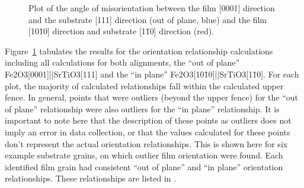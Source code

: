 \documentclass[12pt,%
              twoside,
               letterpaper]{uiothesis}
\begin{document}
\begin{figure}

	\begin{center}
		\caption[Plot of film-substrate misorientations]{%
			Plot of the angle of misorientation between the film
			[0001] direction and the substrate [111] direction (out of plane, 
			blue) and the film [10\={1}0] direction and substrate [1\={1}0] 
			direction (red).}
	\label{fig:orplots}
\end{center}
\end{figure}
Figure~\ref{fig:orplots} tabulates the results for the orientation relationship calculations
including all calculations for both alignments, the ``out of plane''
Fe2O3[0001]||SrTiO3[111] and the ``in plane''
Fe2O3[10\={1}0]||SrTiO3[1\={1}0]. For each plot, the majority of calculated
relationships fall within the calculated upper fence. In general, points that were
outliers (beyond the upper fence) for the ``out of plane'' relationship were also outliers
for the ``in plane'' relationship. It is important to note here that the description of
these points as outliers does not imply an error in data collection, or that the values
calculated for these points don't represent the actual orientation relationships. This is
shown here for six example substrate grains, on which outlier film orientation were found.
Each identified film grain had consistent ``out of plane'' and ``in plane'' orientation
relationships. These relationships are listed in .
\end{document}
